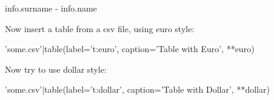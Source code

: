 {{ info.surname }} - {{ info.name }}

Now insert a table from a csv file, using euro style:

{{ 'some.csv'|table(label='t:euro', caption='Table with Euro', **euro) }}


Now try to use dollar style:

{{ 'some.csv'|table(label='t:dollar', caption='Table with Dollar', **dollar) }}

